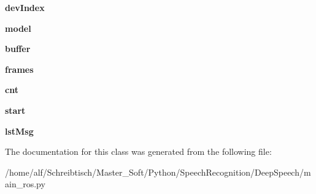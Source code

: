 \begin{DoxyCompactItemize}
\item 
\hypertarget{classmain__ros_1_1SpeechRecognition_a51ecbc69caaa3dcd08b58eb24a9900fe}{{\bfseries dev\-Index}}\label{classmain__ros_1_1SpeechRecognition_a51ecbc69caaa3dcd08b58eb24a9900fe}

\item 
\hypertarget{classmain__ros_1_1SpeechRecognition_acdf889fa37e14af3db0860fc40b9fdcb}{{\bfseries model}}\label{classmain__ros_1_1SpeechRecognition_acdf889fa37e14af3db0860fc40b9fdcb}

\item 
\hypertarget{classmain__ros_1_1SpeechRecognition_a837436883cac35ff281d8e15119ac00e}{{\bfseries buffer}}\label{classmain__ros_1_1SpeechRecognition_a837436883cac35ff281d8e15119ac00e}

\item 
\hypertarget{classmain__ros_1_1SpeechRecognition_a3a70c12f786be1dd9610e2f2e2308593}{{\bfseries frames}}\label{classmain__ros_1_1SpeechRecognition_a3a70c12f786be1dd9610e2f2e2308593}

\item 
\hypertarget{classmain__ros_1_1SpeechRecognition_a087cee8fb831685cf7dafdecd24fd6f0}{{\bfseries cnt}}\label{classmain__ros_1_1SpeechRecognition_a087cee8fb831685cf7dafdecd24fd6f0}

\item 
\hypertarget{classmain__ros_1_1SpeechRecognition_aa27ac9930d16602f91b72b43d3c49931}{{\bfseries start}}\label{classmain__ros_1_1SpeechRecognition_aa27ac9930d16602f91b72b43d3c49931}

\item 
\hypertarget{classmain__ros_1_1SpeechRecognition_a58e49a1aa41b3a8df7d090cb3fb9c2e5}{{\bfseries lst\-Msg}}\label{classmain__ros_1_1SpeechRecognition_a58e49a1aa41b3a8df7d090cb3fb9c2e5}

\end{DoxyCompactItemize}


The documentation for this class was generated from the following file\-:\begin{DoxyCompactItemize}
\item 
/home/alf/\-Schreibtisch/\-Master\-\_\-\-Soft/\-Python/\-Speech\-Recognition/\-Deep\-Speech/main\-\_\-ros.\-py\end{DoxyCompactItemize}
